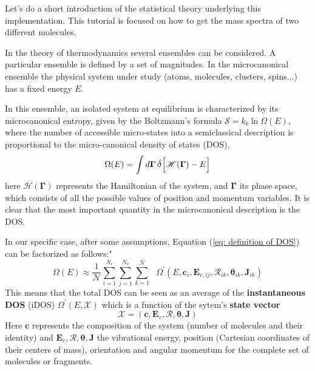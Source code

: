 \documentclass[a4paper,12pt]{article}
\begin{document}
Let's do a short introduction of the statistical theory underlying this implementation.
This tutorial is focused on how to get the mass spectra of two different molecules.

In the theory of thermodynamics several ensembles can be considered. A particular ensemble is defined by a set of magnitudes. In the microcanonical ensemble the physical system under study (atoms, molecules, clusters, spins...) has a fixed energy $E$.

In this ensemble, an isolated system at equilibrium is characterized by its microcanonical entropy, given by the 
Boltzmann's formula  $\mathcal{S}=k_b\ln\Omega(E)$, where the number of accessible micro-states into a semiclassical description
is proportional to the micro-canonical density of states (DOS),
\begin{equation}
\Omega(E)
=
\int
d\mathbf{\Gamma}\,
\mathlarger{\delta}
\Bigl[
\mathscr{H}(\boldsymbol{\Gamma}) - E
\Bigr]
\label{eq: definition of DOS}
\end{equation}
here $\mathscr{H}(\boldsymbol{\Gamma})$ represents the Hamiltonian of the system, and $\boldsymbol{\Gamma}$
its phase space, which consists of all the possible values of position and momentum variables.
It is clear that the most important quantity in the microcanonical description is the DOS.

In our specific case, after some assumptions, Equation (\ref{eq: definition of DOS}) can be factorized as follows:"
\begin{equation}
\Omega(E)
\approx
\frac{1}{\mathcal{N}}
\sum_{i=1}^{N_c}
\sum_{j=1}^{N_v}
\sum_{k=1}^{\mathcal{N}}
\,\,\,\,
\Omega^\prime
\left(
E,\mathbf{c}_i,\mathbf{E}_{v,ij},\boldsymbol{\mathcal{R}}_{ik},\boldsymbol{\theta}_{ik},\mathbf{J}_{ik}
\right)
\label{eq:total dos montecarlo}
\end{equation}
This means that the total DOS can be seen as an average of the \textbf{ instantaneous DOS } (iDOS)
$\Omega^\prime
\left(
E,\boldsymbol{\mathcal{X}}
\right)$
which is a function of the sytem's \textbf{state vector}
\begin{equation}
\boldsymbol{\mathcal{X}}=(\mathbf{c},\mathbf{E}_v,\boldsymbol{\mathcal{R}},\boldsymbol{\theta},\mathbf{J})
\end{equation}
Here $\mathbf{c}$ represents the composition of the system (number of molecules and their identity) and
$\mathbf{E}_v,\boldsymbol{\mathcal{R}},\boldsymbol{\theta},\mathbf{J}$ the
vibrational energy, position (Cartesian coordinates of their centers of mass), orientation and angular momentum
for the complete set of molecules or fragments.
\end{document}
